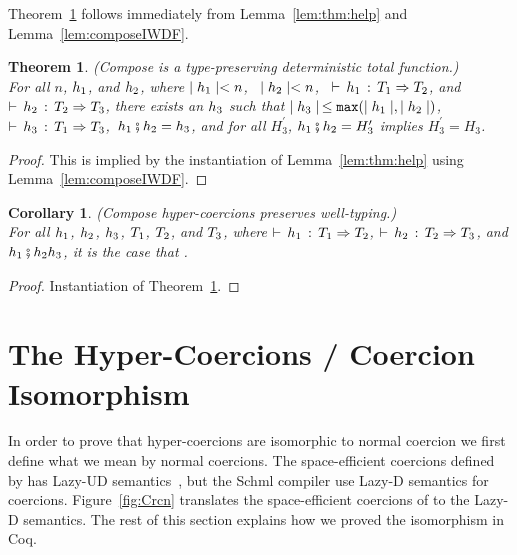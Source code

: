 \documentclass[acmtog, authorversion, acmlarge]{acmart}
\newtheorem{thm}{Theorem}
\newtheorem{cor}{Corollary}
\begin{document}
Theorem~\ref{thm:composeWDF} follows immediately from
Lemma~\ref{lem:thm:help} and Lemma~\ref{lem:composeIWDF}.

\begin{thm}
  \label{thm:composeWDF}
  (Compose is a type-preserving deterministic total function.)\\
  For all $n$, $h_1$, and $h_2$, where
  $\mid h_1 \mid < n$, \,
  $\mid h_2 \mid < n$, \,
  $\vdash \, h_1 \, : \, T_1 \Rightarrow T_2$, and
  $\vdash \, h_2 \, : \, T_2 \Rightarrow T_3$,
  there exists an $h_3$ such that
  $\mid h_3 \mid \, \le \texttt{max}(\mid h_1 \mid, \mid h_2 \mid)$, \,
  $\vdash \, h_3 \, : \, T_1 \Rightarrow T_3$,\,
  $h_1 \fatsemi h_2 = h_3$,
  and for all $H_{3}^{\prime}$, \; $h_1 \fatsemi h_2 = H_{3}^{\prime}$
  implies $H_{3}^{\prime} = H_{3}$.
\end{thm}
\begin{proof}
  This is implied by the instantiation of Lemma~\ref{lem:thm:help}
  using Lemma~\ref{lem:composeIWDF}.
\end{proof}

\begin{cor}
  \label{cor:compose_preserves_typing}
  (Compose hyper-coercions preserves well-typing.)\\
  For all $h_1$, $h_2$, $h_3$, $T_1$, $T_2$, and $T_3$, where
  $\vdash \, h_1 \, : \, T_1 \Rightarrow T_2$, $\vdash \, h_2 \, : \, T_2 \Rightarrow T_3$, and
  $h_1 \fatsemi h_2{h_3}$, it is the case that .
\end{cor}
\begin{proof}
  Instantiation of Theorem~\ref{thm:composeWDF}.
\end{proof}

\clearpage

\section{The Hyper-Coercions / Coercion Isomorphism}
\label{sec:iso}

In order to prove that hyper-coercions are isomorphic to normal
coercion we first define what we mean by normal coercions.  The
space-efficient coercions defined by \citet{Siek:2015ab} has
Lazy-UD semantics~\citep{Siek:2009rt}, but the Schml compiler use
Lazy-D semantics for coercions.  Figure~\ref{fig:Crcn} translates the
space-efficient coercions of \citet{Siek:2015ab} to the Lazy-D
semantics. The rest of this section explains how we
proved the isomorphism in Coq. 
\end{document}
